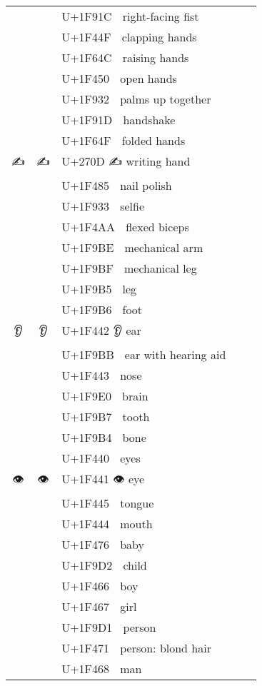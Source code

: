 \documentclass[a4paper,12pt]{ltjarticle}
\newcommand{\fontA}[1]{{\fontspec[RawFeature={mode=harf,dist,ccmp}]{Segoe UI Emoji} #1}}
\newcommand{\fontB}[1]{{\fontspec[RawFeature={mode=harf,dist,ccmp}]{Noto Color Emoji} #1}}
\begin{document}
\begin{longtable}[c]{ccp{0.8\linewidth}}
\fontA{🤜}&\fontB{🤜}&U+1F91C 🤜 right-facing fist\\
\fontA{👏}&\fontB{👏}&U+1F44F 👏 clapping hands\\
\fontA{🙌}&\fontB{🙌}&U+1F64C 🙌 raising hands\\
\fontA{👐}&\fontB{👐}&U+1F450 👐 open hands\\
\fontA{🤲}&\fontB{🤲}&U+1F932 🤲 palms up together\\
\fontA{🤝}&\fontB{🤝}&U+1F91D 🤝 handshake\\
\fontA{🙏}&\fontB{🙏}&U+1F64F 🙏 folded hands\\
\fontA{✍}&\fontB{✍}&U+270D ✍ writing hand\\
\fontA{💅}&\fontB{💅}&U+1F485 💅 nail polish\\
\fontA{🤳}&\fontB{🤳}&U+1F933 🤳 selfie\\
\fontA{💪}&\fontB{💪}&U+1F4AA 💪 flexed biceps\\
\fontA{🦾}&\fontB{🦾}&U+1F9BE 🦾 mechanical arm\\
\fontA{🦿}&\fontB{🦿}&U+1F9BF 🦿 mechanical leg\\
\fontA{🦵}&\fontB{🦵}&U+1F9B5 🦵 leg\\
\fontA{🦶}&\fontB{🦶}&U+1F9B6 🦶 foot\\
\fontA{👂}&\fontB{👂}&U+1F442 👂 ear\\
\fontA{🦻}&\fontB{🦻}&U+1F9BB 🦻 ear with hearing aid\\
\fontA{👃}&\fontB{👃}&U+1F443 👃 nose\\
\fontA{🧠}&\fontB{🧠}&U+1F9E0 🧠 brain\\
\fontA{🦷}&\fontB{🦷}&U+1F9B7 🦷 tooth\\
\fontA{🦴}&\fontB{🦴}&U+1F9B4 🦴 bone\\
\fontA{👀}&\fontB{👀}&U+1F440 👀 eyes\\
\fontA{👁}&\fontB{👁}&U+1F441 👁 eye\\
\fontA{👅}&\fontB{👅}&U+1F445 👅 tongue\\
\fontA{👄}&\fontB{👄}&U+1F444 👄 mouth\\
\fontA{👶}&\fontB{👶}&U+1F476 👶 baby\\
\fontA{🧒}&\fontB{🧒}&U+1F9D2 🧒 child\\
\fontA{👦}&\fontB{👦}&U+1F466 👦 boy\\
\fontA{👧}&\fontB{👧}&U+1F467 👧 girl\\
\fontA{🧑}&\fontB{🧑}&U+1F9D1 🧑 person\\
\fontA{👱}&\fontB{👱}&U+1F471 👱 person: blond hair\\
\fontA{👨}&\fontB{👨}&U+1F468 👨 man\\

\end{longtable}
\end{document}
